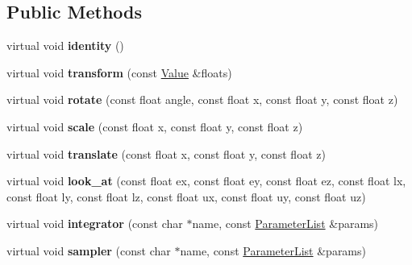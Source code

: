 \subsection*{Public Methods}
\begin{DoxyCompactItemize}
\item 
\mbox{\label{structpbrt_1_1_importer_ab86175cffaeef08fc4726f7c59e9bc60}} 
virtual void {\bfseries identity} ()
\item 
\mbox{\label{structpbrt_1_1_importer_ac4c6310d7de743d78bdf23b34469a70f}} 
virtual void {\bfseries transform} (const \hyperlink{structpbrt_1_1_value}{Value} \&floats)
\item 
\mbox{\label{structpbrt_1_1_importer_a508120d6b97f4dc378b285b9730db785}} 
virtual void {\bfseries rotate} (const float angle, const float x, const float y, const float z)
\item 
\mbox{\label{structpbrt_1_1_importer_a4f304df8a3ff25ce47bdad5938ad3ea4}} 
virtual void {\bfseries scale} (const float x, const float y, const float z)
\item 
\mbox{\label{structpbrt_1_1_importer_a6d91ab7207e7f432f1c0a510b4b73ea4}} 
virtual void {\bfseries translate} (const float x, const float y, const float z)
\item 
\mbox{\label{structpbrt_1_1_importer_aee5002ee42abd2e23082148cdd88328a}} 
virtual void {\bfseries look\+\_\+at} (const float ex, const float ey, const float ez, const float lx, const float ly, const float lz, const float ux, const float uy, const float uz)
\item 
\mbox{\label{structpbrt_1_1_importer_ae7385156500ea22e073b80038803798e}} 
virtual void {\bfseries integrator} (const char $\ast$name, const \hyperlink{structpbrt_1_1_parameter_list}{Parameter\+List} \&params)
\item 
\mbox{\label{structpbrt_1_1_importer_a346e9b07730f5101aff9fc52cf96d3a4}} 
virtual void {\bfseries sampler} (const char $\ast$name, const \hyperlink{structpbrt_1_1_parameter_list}{Parameter\+List} \&params)

\end{DoxyCompactItemize}

